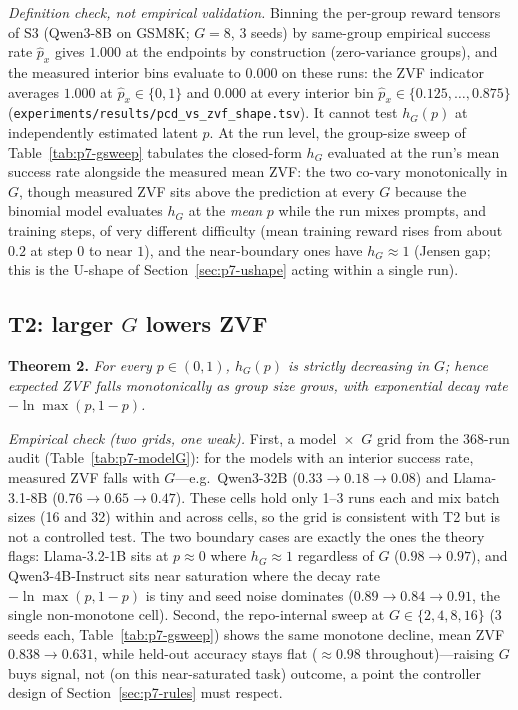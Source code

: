 \emph{Definition check, not empirical validation.} Binning the per-group reward tensors of S3
(Qwen3-8B on GSM8K; $G = 8$, 3 seeds) by
same-group empirical success rate $\hat p_x$ gives $1.000$ at the
endpoints by construction (zero-variance groups), and the measured
interior bins evaluate to $0.000$ on these runs:
the ZVF indicator averages
$1.000$ at $\hat p_x \in \{0, 1\}$ and $0.000$ at every interior bin
$\hat p_x \in \{0.125, \dots, 0.875\}$
(\texttt{experiments/results/pcd\_vs\_zvf\_shape.tsv}). It cannot test
$h_G(p)$ at independently estimated latent $p$. At the run level, the
group-size sweep of Table~\ref{tab:p7-gsweep} tabulates the closed-form
$h_G$ evaluated at the run's mean success rate alongside the measured
mean ZVF: the two co-vary monotonically in $G$, though measured ZVF sits above the
prediction at every $G$ because the binomial model evaluates $h_G$ at the
\emph{mean} $p$ while the run mixes prompts, and training steps, of very
different difficulty (mean training reward rises from about $0.2$ at step 0
to near $1$), and the near-boundary ones have $h_G \approx 1$ (Jensen gap; this is the U-shape of
Section~\ref{sec:p7-ushape} acting within a single run).

\subsection{T2: larger \texorpdfstring{$G$}{G} lowers ZVF}
\label{sec:p7-t2}
\textbf{Theorem 2.} \emph{For every $p \in (0,1)$, $h_G(p)$ is strictly
decreasing in $G$; hence expected ZVF falls monotonically as group size
grows, with exponential decay rate $-\ln\max(p, 1-p)$.}

\emph{Empirical check (two grids, one weak).} First, a model~$\times$~$G$
grid from the 368-run audit (Table~\ref{tab:p7-modelG}): for the models with
an interior success rate, measured ZVF falls with $G$---e.g.\ Qwen3-32B
($0.33 \to 0.18 \to 0.08$) and Llama-3.1-8B ($0.76 \to 0.65 \to 0.47$). These
cells hold only 1--3 runs each and mix batch sizes (16 and 32) within and
across cells, so the grid is consistent with T2 but is not a controlled test. The two boundary cases are exactly the ones the
theory flags: Llama-3.2-1B sits at $p \approx 0$ where $h_G \approx 1$
regardless of $G$ ($0.98 \to 0.97$), and Qwen3-4B-Instruct sits near
saturation where the decay rate $-\ln\max(p,1-p)$ is tiny and seed noise
dominates ($0.89 \to 0.84 \to 0.91$, the single non-monotone cell). Second,
the repo-internal sweep at $G \in \{2,4,8,16\}$ (3 seeds each,
Table~\ref{tab:p7-gsweep}) shows the same monotone decline, mean ZVF
$0.838 \to 0.631$, while held-out accuracy stays flat ($\approx 0.98$
throughout)---raising $G$ buys signal, not (on this near-saturated task)
outcome, a point the controller design of Section~\ref{sec:p7-rules} must
respect.

